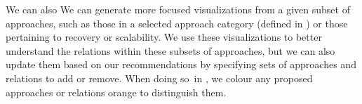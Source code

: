     We can also \else We can \fi generate more focused visualizations from a
given subset of approaches, such as \ifnotpaper\else those in a selected
    approach category (defined in ) or \fi those pertaining to
recovery or scalability.
We use these visualizations to better understand the relations within these
subsets of approaches, but we can also update them based on
our recommendations by specifying sets of approaches and relations to add or
remove. %
When doing so\ifnotpaper\ in \fi, we colour any proposed approaches
or relations orange to distinguish them.

\ifnotpaper
    
\fi
